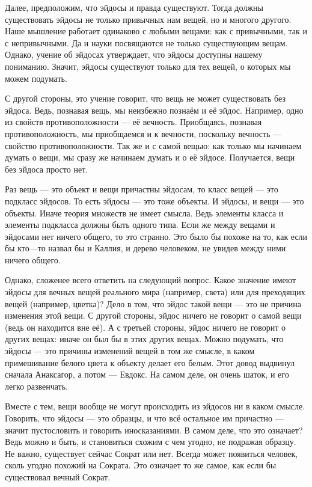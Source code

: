 \documentclass[oneside, 17pt, dvipsnames]{extbook}
\begin{document}
Далее, предположим, что эйдосы и правда существуют. Тогда должны существовать эйдосы не только привычных нам вещей, но и многого другого. Наше мышление работает одинаково с любыми вещами: как с привычными, так и с непривычными. Да и науки посвящаются не только существующим вещам. Однако, учение об эйдосах утверждает, что эйдосы доступны нашему пониманию. Значит, эйдосы существуют только для тех вещей, о которых мы можем подумать.

С другой стороны, это учение говорит, что вещь не может существовать без эйдоса. Ведь, познавая вещь, мы неизбежно познаём и её эйдос. Например, одно из свойств противоположности --- её вечность. Приобщаясь, познавая противоположность, мы приобщаемся и к вечности, поскольку вечность --- свойство противоположности. Так же и с самой вещью: как только мы начинаем думать о вещи, мы сразу же начинаем думать и о её эйдосе. Получается, вещи без эйдоса просто нет.

Раз вещь --- это объект и вещи причастны эйдосам, то класс вещей --- это подкласс эйдосов. То есть эйдосы --- это тоже объекты. И эйдосы, и вещи --- это объекты. Иначе теория множеств не имеет смысла. Ведь элементы класса и элементы подкласса должны быть одного типа. Если же между вещами и эйдосами нет ничего общего, то это странно. Это было бы похоже на то, как если бы кто---то назвал бы и Каллия, и дерево человеком, не увидев между ними ничего общего.

Однако, сложенее всего ответить на следующий вопрос. Какое значение имеют эйдосы для вечных вещей реального мира (например, света) или для преходящих вещей (например, цветка)? Дело в том, что эйдос такой вещи --- это не причина изменения этой вещи. С другой стороны, эйдос ничего не говорит о самой вещи (ведь он находится вне её). А с третьей стороны, эйдос ничего не говорит о других вещах: иначе он был бы в этих других вещах. Можно подумать, что эйдосы --- это причины изменений вещей в том же смысле, в каком примешивание белого цвета к объекту делает его белым. Этот довод выдвинул сначала Анаксагор, а потом --- Евдокс. На самом деле, он очень шаток, и его легко развенчать.

Вместе с тем, вещи вообще не могут происходить из эйдосов ни в каком смысле. Говорить, что эйдосы --- это образцы, и что всё остальное им причастно --- значит пустословить и говорить иносказаниями. В самом деле, что это означает? Ведь можно и быть, и становиться схожим с чем угодно, не подражая образцу. Не важно, существует сейчас Сократ или нет. Всегда может появиться человек, сколь угодно похожий на Сократа. Это означает то же самое, как если бы существовал вечный Сократ.
\end{document}
